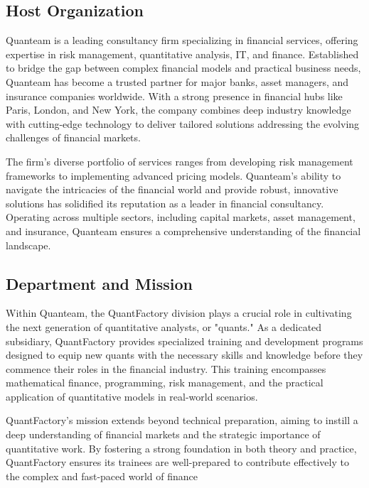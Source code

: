 \documentclass[12pt]{article}
\begin{document}
\subsection{Host Organization}
Quanteam is a leading consultancy firm specializing in financial services, offering expertise in risk management, quantitative analysis, IT, and finance. Established to bridge the gap between complex financial models and practical business needs, Quanteam has become a trusted partner for major banks, asset managers, and insurance companies worldwide. With a strong presence in financial hubs like Paris, London, and New York, the company combines deep industry knowledge with cutting-edge technology to deliver tailored solutions addressing the evolving challenges of financial markets.\\\par
The firm's diverse portfolio of services ranges from developing risk management frameworks to implementing advanced pricing models. Quanteam's ability to navigate the intricacies of the financial world and provide robust, innovative solutions has solidified its reputation as a leader in financial consultancy. Operating across multiple sectors, including capital markets, asset management, and insurance, Quanteam ensures a comprehensive understanding of the financial landscape.
\subsection{Department and Mission}
Within Quanteam, the QuantFactory division plays a crucial role in cultivating the next generation of quantitative analysts, or "quants." As a dedicated subsidiary, QuantFactory provides specialized training and development programs designed to equip new quants with the necessary skills and knowledge before they commence their roles in the financial industry. This training encompasses mathematical finance, programming, risk management, and the practical application of quantitative models in real-world scenarios.\\\par
QuantFactory's mission extends beyond technical preparation, aiming to instill a deep understanding of financial markets and the strategic importance of quantitative work. By fostering a strong foundation in both theory and practice, QuantFactory ensures its trainees are well-prepared to contribute effectively to the complex and fast-paced world of finance
\end{document}
